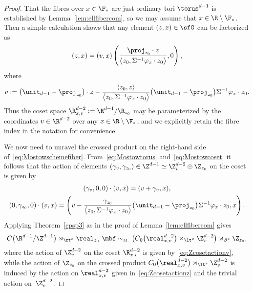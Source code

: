 \begin{proof}
That the fibres over $x\in\F_*$ are just ordinary tori $\torus^{d-1}$
is established by Lemma~\ref{lem:ellfibercom}, so we may assume that $x\in\R\setminus\F_*$. Then a simple
calculation shows that any element $(z,x)\in\sfG$ can be factorized as
\[
(z,x) = (v,x) \left(\frac{\proj_{ z_0}\cdot z}{\big\langle z_0,\Sigma^{-1} \varphi_x\cdot z_0\big\rangle} , 0\right) ,
\]
where
\begin{gather}\label{eq:Mostowcoset}
v:=\big(\unit_{d-1}-\proj_{ z_0}\big)\cdot z - \frac{\langle{ z_0},
 z\rangle}{\big\langle{ z_0},\Sigma^{-1} \varphi_x\cdot z_0\big\rangle}
\big(\unit_{d-1}-\proj_{ z_0}\big) \Sigma^{-1} \varphi_x\cdot z_0 .
\end{gather}
Thus the coset space $\R_{x,v}^{d-2}:=\R^{d-1}/\R_{ z_0}$ may be
parameterized by the coordinates $v\in\R^{d-2}$ over any
$x\in\R\setminus\F_*$, and we explicitly retain the fibre index in the
notation for convenience.

We now need to unravel the crossed product
on the right-hand side of~\eqref{eq:Mostowschemefiber}.
From~\eqref{eq:Mostowtorus} and~\eqref{eq:Mostowcoset} it follows that the action of elements
$(\gamma_v,\gamma_{ z_0})\in\Z^{d-1}\simeq\Z_v^{d-2}\oplus\Z_{
 z_0}$ on the coset is given by
\begin{gather}\label{eq:Zcosetactionv}
(\gamma_v,0,0)\cdot (v,x) = (v+\gamma_v,x) , \\
(0,\gamma_{ z_0},0)\cdot (v,x) = \left(v-\frac{
 \gamma_{ z_0}}{\big\langle{ z_0},\Sigma^{-1} \varphi_x\cdot z_0\big\rangle}
\big(\unit_{d-1}-\proj_{ z_0}\big) \Sigma^{-1} \varphi_x\cdot
 z_0 , x\right) .
\label{eq:Zcosetactionz}\end{gather}
Applying
Theorem~\ref{cpsp3} as in the proof of Lemma~\ref{lem:ellfibercom} gives
\begin{gather*}%
C\big(\R^{d-1}/\Z^{d-1}\big)\rtimes_{\rt^x}\real_{ z_0}
\ \mbf\sim_{\text{\tiny M}} \
\big(C_0\big(\real^{d-2}_{x,v}\big)\rtimes_{\lt^x}\Z^{d-2}_{v}\big) \rtimes_{\beta^x} \Z_{ z_0} ,
\end{gather*}
where the action of $\Z^{d-2}_v$ on the coset $\R^{d-2}_{x,v}$ is
given by~\eqref{eq:Zcosetactionv}, while the action of $\Z_{ z_0}$ on the crossed product
$C_0\big(\real^{d-2}_{x,v}\big)\rtimes_{\lt^x}\Z^{d-2}_{v}$ is induced by the
action on $\real^{d-2}_{x,v}$ given in~\eqref{eq:Zcosetactionz} and the trivial action on~$\Z^{d-2}_{v}$.


\end{proof}
